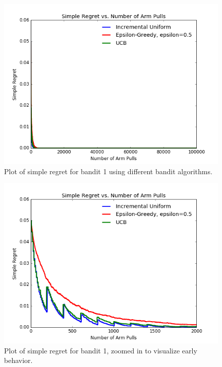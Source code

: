 \documentclass[paper=a4, fontsize=11pt]{scrartcl}
\begin{document}
\begin{figure}
\centering
	\includegraphics[width=1\linewidth]{bandit1_simple_regret.png}
\caption{Plot of simple regret for bandit 1 using different bandit algorithms.}
\label{fig:simple_bandit1}
\end{figure}

\begin{figure}
\centering
	\includegraphics[width=1\linewidth]{bandit1_simple_regret_zoomed.png}
\caption{Plot of simple regret for bandit 1, zoomed in to visualize early behavior.}
\label{fig:simple_bandit1_zoomed}
\end{figure}
\end{document}
